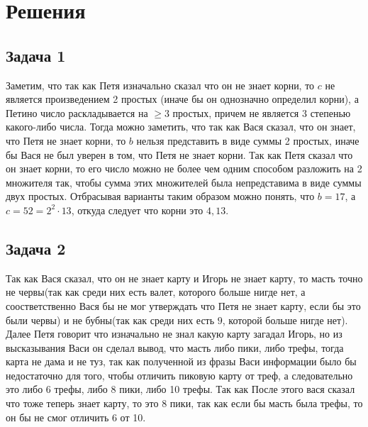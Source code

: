 \newpage
\section*{Решения}
\subsection*{Задача 1}
	Заметим, что так как Петя изначально сказал что он не знает корни, то $c$ не является произведением 2 простых (иначе бы он однозначно определил корни), а Петино число раскладывается на $\geqslant 3$ простых, причем не является 3 степенью какого-либо числа. Тогда можно заметить, что так как Вася сказал, что он знает, что Петя не знает корни, то $b$ нельзя представить в виде суммы 2 простых, иначе бы Вася не был уверен в том, что Петя не знает корни. Так как Петя сказал что он знает корни, то его число можно не более чем одним способом разложить на 2 множителя так, чтобы сумма этих множителей была непредставима в виде суммы двух простых. Отбрасывая варианты таким образом можно понять, что $b = 17$, а $c = 52 = 2^2 \cdot 13$, откуда следует что корни это $4, 13$. 
\vskip 0.4in

\subsection*{Задача 2}
	Так как Вася сказал, что он не знает карту и Игорь не знает карту, то масть точно не червы(так как среди них есть валет, которого больше нигде нет, а соостветственно Вася бы не мог утверждать что Петя не знает карту, если бы это были червы) и не бубны(так как среди них есть $9$, которой больше нигде нет). Далее Петя говорит что изначально не знал какую карту загадал Игорь, но из высказывания Васи он сделал вывод, что масть либо пики, либо трефы, тогда карта не дама и не туз, так как полученной из фразы Васи информации было бы недостаточно для того, чтобы отличить пиковую карту от треф, а следовательно это либо 6 трефы, либо 8 пики, либо 10 трефы. Так как После этого вася сказал что тоже теперь знает карту, то это 8 пики, так как если бы масть была трефы, то он бы не смог отличить 6 от 10.
\vskip 0.4in

